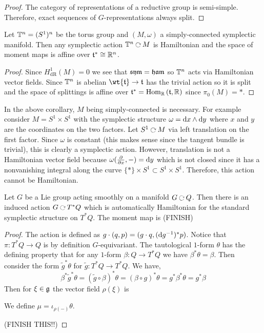\documentclass[12pt]{extarticle}
\newcommand{\R}{\mathbb{R}}
\newcommand{\dR}{\mathrm{dR}}
\begin{document}
\begin{proof}
The category of representations of a reductive group is semi-simple. Therefore, exact sequences of $G$-representations always split. 
\end{proof}

\begin{cor}
Let $\mathbb{T}^n = (S^1)^n$ be the torus group and $(M, \omega)$ a simply-connected symplectic manifold. Then any symplectic action $\T^n \acts M$ is Hamiltonian and the space of moment maps is affine over $\t^* \cong \R^n$.
\end{cor}

\begin{proof}
Since $H^1_{\dR}(M) = 0$ we see that $\mathfrak{sym} = \mathfrak{ham}$ so $\mathbb{T}^n$ acts via Hamiltonian vector fields. Since $\mathbb{T}^n$ is abelian $\wt{\t} \to \t$ has the trivial action so it is split and the space of splittings is affine over $\mathfrak{t}^* = \mathrm{Hom}_{\mathbb{R}} \left( \mathfrak{t}, \mathbb{R} \right)$ since $\pi_0(M) = *$.
\end{proof}

\begin{example}
In the above corollary, $M$ being simply-connected is necessary. For example consider $M = S^1 \times S^1$ with the symplectic structure $\omega = \mathrm{d}{x} \wedge \mathrm{d}{y}$ where $x$ and $y$ are the coordinates on the two factors. Let $S^1 \acts M$ via left translation on the first factor. Since $\omega$ is constant (this makes sense since the tangent bundle is trivial), this is clearly a symplectic action. However, translation is not a Hamiltonian vector field because $\omega(\frac{\partial{}}{\partial{x}}, -) = \mathrm{d}{y}$ which is not closed since it has a nonvanishing integral along the curve $\{ * \} \times S^1 \subset S^1 \times S^1$. Therefore, this action cannot be Hamiltonian.
\end{example}

\begin{prop}
Let $G$ be a Lie group acting smoothly on a manifold $G \acts Q$. Then there is an induced action $G \acts T^* Q$ which is automatically Hamiltonian for the standard symplectic structure on $T^* Q$. The moment map is (FINISH)
\end{prop}

\begin{proof}
The action is defined as $g \cdot (q, p) = (g \cdot q, (\mathrm{d}{g^{-1}})^* p)$. Notice that $\pi : T^* Q \to Q$ is by definition $G$-equivariant. The tautological $1$-form $\theta$ has the defining property that for any $1$-form $\beta : Q \to T^* Q$ we have $\beta^* \theta = \beta$. Then consider the form $\tilde{g}^* \theta$ for $\tilde{g} : T^* Q \to T^* Q$. We have,
\[ \beta^* \tilde{g}^* \theta  = (\tilde{g} \circ \beta)^* \theta = (\beta \circ g)^* \theta = g^* \beta^* \theta = g^* \beta \] 
Then for $\xi \in \mathfrak{g}$ the vector field $\rho(\xi)$ is 

We define $\mu = \iota_{\rho(-)} \theta$.

(FINISH THIS!!)
\end{proof}
\end{document}
